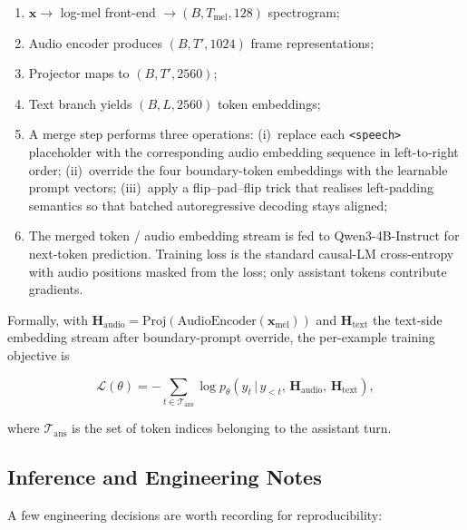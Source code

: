 \begin{enumerate}
  \item $\mathbf{x} \to$ log-mel front-end $\to (B, T_\text{mel}, 128)$
        spectrogram;
  \item Audio encoder produces $(B, T', 1024)$ frame representations;
  \item Projector maps to $(B, T', 2560)$;
  \item Text branch yields $(B, L, 2560)$ token embeddings;
  \item A merge step performs three operations: (i)~replace each
        \verb|<speech>| placeholder with the corresponding audio
        embedding sequence in left-to-right order; (ii)~override the
        four boundary-token embeddings with the learnable prompt
        vectors; (iii)~apply a flip--pad--flip trick that realises
        left-padding semantics so that batched autoregressive decoding
        stays aligned;
  \item The merged token / audio embedding stream is fed to
        Qwen3-4B-Instruct for next-token prediction. Training loss is
        the standard causal-LM cross-entropy with audio positions
        masked from the loss; only assistant tokens contribute
        gradients.
\end{enumerate}

Formally, with
$\mathbf{H}_\text{audio} = \mathrm{Proj}(\mathrm{AudioEncoder}(\mathbf{x}_\text{mel}))$
and $\mathbf{H}_\text{text}$ the text-side embedding stream after
boundary-prompt override, the per-example training objective is

\begin{equation}
  \mathcal{L}(\theta) = -\sum_{t \in \mathcal{T}_\text{ans}}
      \log p_\theta\!\left( y_t \,\Big|\, y_{<t},\, \mathbf{H}_\text{audio},\, \mathbf{H}_\text{text} \right),
  \label{eq:loss}
\end{equation}

where $\mathcal{T}_\text{ans}$ is the set of token indices belonging to
the assistant turn.

\subsection{Inference and Engineering Notes}
\label{subsec:inference}

A few engineering decisions are worth recording for reproducibility:

